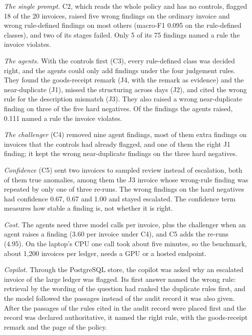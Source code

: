 \documentclass[conference]{IEEEtran}
\begin{document}
\textit{The single prompt.} C2, which reads the whole policy and has no controls, flagged 18 of the 20 invoices, raised five wrong findings on the ordinary invoice and wrong rule-defined findings on most others (macro-F1 0.095 on the rule-defined classes), and two of its stages failed. Only 5 of its 75 findings named a rule the invoice violates.

\textit{The agents.} With the controls first (C3), every rule-defined class was decided right, and the agents could only add findings under the four judgement rules. They found the goods-receipt remark (J4, with the remark as evidence) and the near-duplicate (J1), missed the structuring across days (J2), and cited the wrong rule for the description mismatch (J3). They also raised a wrong near-duplicate finding on three of the five hard negatives. Of the findings the agents raised, 0.111 named a rule the invoice violates.

\textit{The challenger} (C4) removed nine agent findings, most of them extra findings on invoices that the controls had already flagged, and one of them the right J1 finding; it kept the wrong near-duplicate findings on the three hard negatives.

\textit{Confidence} (C5) sent two invoices to sampled review instead of escalation, both of them true anomalies, among them the J3 invoice whose wrong-rule finding was repeated by only one of three re-runs. The wrong findings on the hard negatives had confidence 0.67, 0.67 and 1.00 and stayed escalated. The confidence term measures how stable a finding is, not whether it is right.

\textit{Cost.} The agents need three model calls per invoice, plus the challenger when an agent raises a finding (3.60 per invoice under C4), and C5 adds the re-runs (4.95). On the laptop's CPU one call took about five minutes, so the benchmark, about 1{,}200 invoices per ledger, needs a GPU or a hosted endpoint.

\textit{Copilot.} Through the PostgreSQL store, the copilot was asked why an escalated invoice of the large ledger was flagged. Its first answer named the wrong rule: retrieval by the wording of the question had ranked the duplicate rules first, and the model followed the passages instead of the audit record it was also given. After the passages of the rules cited in the audit record were placed first and the record was declared authoritative, it named the right rule, with the goods-receipt remark and the page of the policy.
\end{document}
